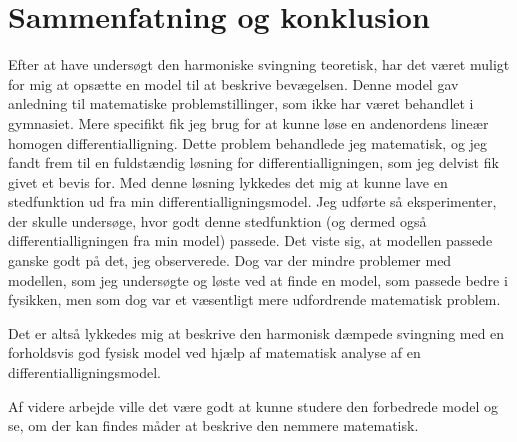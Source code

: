 \chapter{Sammenfatning og konklusion}
Efter at have undersøgt den harmoniske svingning teoretisk, har det været muligt for mig at opsætte en model til at beskrive bevægelsen. 
Denne model gav anledning til matematiske problemstillinger, som ikke har været behandlet i gymnasiet.
Mere specifikt fik jeg brug for at kunne løse en andenordens lineær homogen differentialligning. 
Dette problem behandlede jeg matematisk, og jeg fandt frem til en fuldstændig løsning for differentialligningen, som jeg delvist fik givet et bevis for. 
Med denne løsning lykkedes det mig at kunne lave en stedfunktion ud fra min differentialligningsmodel.
Jeg udførte så eksperimenter, der skulle undersøge, hvor godt denne stedfunktion (og dermed også differentialligningen fra min model) passede.
Det viste sig, at modellen passede ganske godt på det, jeg observerede.
Dog var der mindre problemer med modellen, som jeg undersøgte og løste ved at finde en model, som passede bedre i fysikken, men som dog var et væsentligt mere udfordrende matematisk problem.

Det er altså lykkedes mig at beskrive den harmonisk dæmpede svingning med en forholdsvis god fysisk model ved hjælp af matematisk analyse af en differentialligningsmodel.
 
Af videre arbejde ville det være godt at kunne studere den forbedrede model og se, om der kan findes måder at beskrive den nemmere matematisk. 